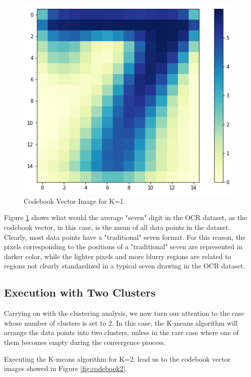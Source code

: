 \documentclass{article}
\begin{document}
\begin{figure}[h!]
    \centering
    \includegraphics[scale=0.4]{images/codebook_cluster1.png}
    \caption{Codebook Vector Image for K=1.}
    \label{fig:codebook1}
\end{figure}

Figure \ref{fig:codebook1} shows what would the average "seven" digit in the OCR dataset, as the codebook vector, in this case, is the mean of all data points in the dataset. Clearly, most data points have a "traditional" seven format. For this reason, the pixels corresponding to the positions of a "traditional" seven are represented in darker color, while the lighter pixels and more blurry regions are related to regions not clearly standardized in a typical seven drawing in the OCR dataset.

\subsection{Execution with Two Clusters}

Carrying on with the clustering analysis, we now turn our attention to the case whose number of clusters is set to 2. In this case, the K-means algorithm will arrange the data points into two clusters, unless in the rare case where one of them becomes empty during the convergence process.

Executing the K-means algorithm for K=2, lead us to the codebook vector images showed in Figure \ref{fig:codebook2}.
\end{document}

